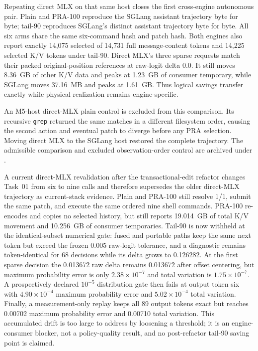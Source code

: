 \documentclass[11pt]{article}
\begin{document}
Repeating direct MLX on that same host closes the first cross-engine autonomous
pair.  Plain and PRA-100 reproduce the SGLang assistant trajectory byte for
byte; tail-90 reproduces SGLang's distinct assistant trajectory byte for byte.
All six arms share the same six-command hash and patch hash.  Both engines also
report exactly 14,075 selected of 14,731 full message-content tokens and 14,225
selected K/V tokens under tail-90.  Direct MLX's three sparse requests match
their packed original-position references at raw-logit delta 0.0.  It still
moves 8.36~GB of other K/V data and peaks at 1.23~GB of consumer temporary,
while SGLang moves 37.16~MB and peaks at 1.61~GB.  Thus logical savings transfer
exactly while physical realization remains engine-specific.

An M5-host direct-MLX plain control is excluded from this comparison.  Its
recursive \texttt{grep} returned the same matches in a different filesystem
order, causing the second action and eventual patch to diverge before any PRA
selection.  Moving direct MLX to the SGLang host restored the complete
trajectory.  The admissible comparison and excluded observation-order control
are archived under
.

A current direct-MLX revalidation after the transactional-edit refactor changes
Task~01 from six to nine calls and therefore supersedes the older direct-MLX
trajectory as current-stack evidence.  Plain and PRA-100 still resolve 1/1,
submit the same patch, and execute the same ordered nine shell commands.
PRA-100 re-encodes and copies no selected history, but still reports 19.014~GB
of total K/V movement and 10.256~GB of consumer temporaries.  Tail-90 is now
withheld at the identical-subset numerical gate: fused and portable paths keep
the same next token but exceed the frozen 0.005 raw-logit tolerance, and a
diagnostic remains token-identical for 68 decisions while its delta grows to
0.126282.  At the first sparse decision the 0.013672 raw delta remains 0.013672
after offset centering, but maximum probability error is only
$2.38\times10^{-7}$ and total variation is $1.75\times10^{-7}$.  A prospectively
declared $10^{-5}$ distribution gate then fails at output token six with
$4.90\times10^{-4}$ maximum probability error and $5.02\times10^{-4}$ total
variation.  Finally, a measurement-only replay keeps all 89 output tokens exact
but reaches 0.00702 maximum probability error and 0.00710 total variation.
This accumulated drift is too large to address by loosening a threshold; it is
an engine-consumer blocker, not a policy-quality result, and no post-refactor
tail-90 saving point is claimed.
\end{document}
